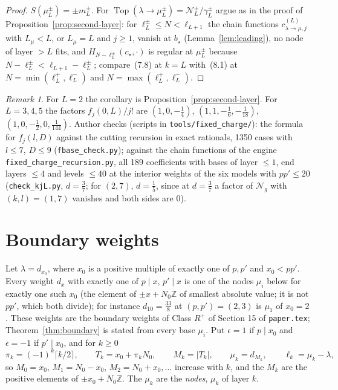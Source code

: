 \documentclass[11pt]{article}
\theoremstyle{remark}
\newtheorem{remark}[theorem]{Remark}
\begin{document}
\begin{proof}
$S(\mu^\pm_L)=\pm m^\pm_L$.  For
$\operatorname{Top}(\lambda\to\mu^\pm_L)=\mathcal N^\pm_L/\gamma^\pm_L$ argue as in
the proof of Proposition~\ref{prop:second-layer}: for
$\ell^\pm_L\le N<\ell_{L+1}$ the chain functions $c^{(L)}_{\lambda\to\mu,j}$
with $L_\mu<L$, or $L_\mu=L$ and $j\ge1$, vanish at $b_\star$
(Lemma~\ref{lem:leading}), no node of layer $>L$ fits, and
$H_{N-\ell^\pm_L}(c_\star,\cdot)$ is regular at $\mu^\pm_L$ because
$N-\ell^\pm_L<\ell_{L+1}-\ell^\pm_L$; compare~(7.8) at $k=L$ with~(8.1) at
$N=\min(\ell^+_L,\ell^-_L)$ and $N=\max(\ell^+_L,\ell^-_L)$.
\end{proof}

\begin{remark}
For $L=2$ the corollary is Proposition~\ref{prop:second-layer}.  For $L=3,4,5$
the factors $f_j(0,L)/j!$ are $(1,0,-\frac14)$, $(1,1,-\frac16,-\frac1{18})$,
$(1,0,-\frac12,0,\frac1{144})$.  Author checks (scripts in
\texttt{tools/fixed\_charge/}): the formula for $f_j(l,D)$
against the cutting recursion in exact rationals, 1350 cases with $l\le7$,
$D\le9$ (\texttt{fbase\_check.py}); against the chain functions of the engine
\texttt{fixed\_charge\_recursion.py}, all 189 coefficients with bases
of layer $\le1$, end layers $\le4$ and levels $\le40$ at the interior weights of
the six models with $pp'\le20$ (\texttt{check\_kjL.py}, $d=\frac37$;
for $(2,7)$, $d=\frac15$, since at $d=\frac37$ a factor of $\mathcal N_g$ with
$(k,l)=(1,7)$ vanishes and both sides are $0$).
\end{remark}

\section{Boundary weights}

Let $\lambda=d_{x_0}$, where $x_0$ is a positive multiple of exactly one of
$p,p'$ and $x_0<pp'$.  Every weight $d_x$ with exactly one of $p\mid x$,
$p'\mid x$ is one of the nodes $\mu_i$ below for exactly one such $x_0$ (the
element of $\pm x+N_0\mathbb Z$ of smallest absolute value; it is not $pp'$, which
both divide); for instance $d_{10}=\frac{33}8$ at $(p,p')=(2,3)$ is $\mu_1$ of
$x_0=2$.  These weights are the boundary weights of Class $R^+$ of Section 15 of
\texttt{paper.tex}; Theorem~\ref{thm:boundary} is stated from every base
$\mu_i$.  Put $\epsilon=1$
if $p\mid x_0$ and $\epsilon=-1$ if $p'\mid x_0$, and for $k\ge0$
\[
 \pi_k=(-1)^k\lceil k/2\rceil,\qquad T_k=x_0+\pi_kN_0,\qquad M_k=|T_k|,\qquad
 \mu_k=d_{M_k},\qquad \ell_k=\mu_k-\lambda ,
\]
so $M_0=x_0$, $M_1=N_0-x_0$, $M_2=N_0+x_0,\dots$ increase with $k$, and the
$M_k$ are the positive elements of $\pm x_0+N_0\mathbb Z$.  The $\mu_k$ are the
\emph{nodes}, $\mu_k$ of layer $k$.
\end{document}
